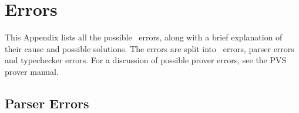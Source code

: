 \chapter{Errors}
\label{errors}

This Appendix lists all the possible \pvs\ errors, along with a brief
explanation of their cause and possible solutions.  The errors are split
into \emacs\ errors, parser errors and typechecker errors.  For a
discussion of possible prover errors, see the PVS prover manual.




\section{Parser Errors}

